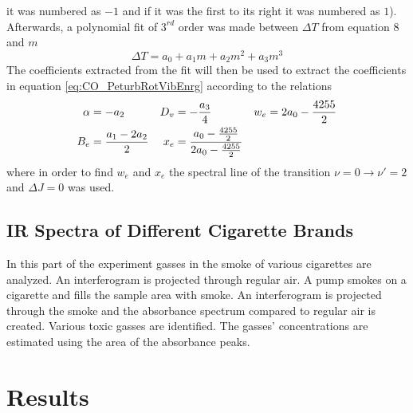 \documentclass[reprint,amsmath,amssymb,aps, prl]{revtex4-2}
\begin{document}
it was numbered as $-1$ and if it was the first to its right
it was numbered as $1$). Afterwards, a polynomial fit of $3^{rd}$ order was made between $\Delta T$ from equation 8 
and $m$
\begin{equation} \label{eq:CO_EnrgStatesFit}
    \Delta T = a_{0}+a_{1}m+a_{2}m^2+a_{3}m^3
\end{equation}
The coefficients extracted from the fit will then be used to extract the coefficients in equation \ref{eq:CO_PeturbRotVibEnrg}
according to the relations 
\begin{equation}
\begin{aligned}
\alpha &=-a_{2} & D_{v}&=-\frac{a_{3}}{4} & w_{e}&=2a_{0}-\frac{4255}{2} \\
B_{e}&=\frac{a_{1}-2a_{2}}{2} &  x_{e}&=\frac{a_{0}-\frac{4255}{2}}{2a_{0}-\frac{4255}{2}}
\end{aligned}
\label{eq:COFITcoefficients}
\centering
\end{equation}
where in order to find $w_{e}$ and $x_{e}$ the spectral line of the transition $\nu =0 \rightarrow \nu'=2$ and $\Delta J =0$ was used. 

\subsection{IR Spectra of Different Cigarette Brands}
In this part of the experiment gasses in the smoke of various cigarettes are analyzed. An interferogram is projected through regular air. A pump smokes on a cigarette and fills the sample area with smoke. An interferogram is projected through the smoke and the absorbance spectrum compared to regular air is created. Various toxic gasses are identified. The gasses' concentrations are estimated using the area of the absorbance peaks.

\section{Results}
\end{document}
